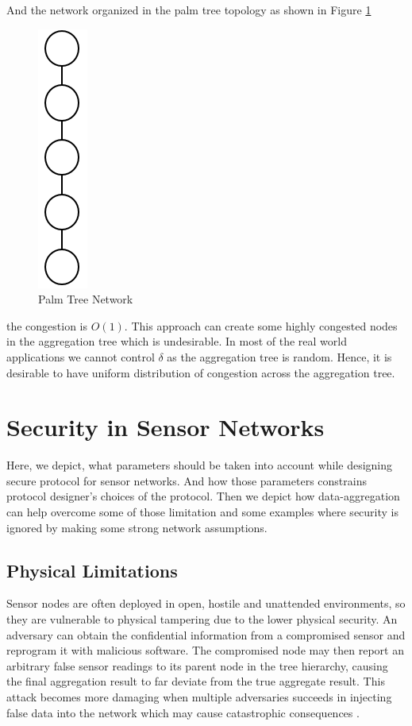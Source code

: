 	And the network organized in the palm tree topology as shown in Figure \ref{fig:palm-tree-network}
	\begin{figure}[h!]
		\centering
		\includegraphics[scale = 1]{images/palm-tree.png}
		\caption{Palm Tree Network}
		\label{fig:palm-tree-network}
	\end{figure}
	the congestion is $O(1)$.
	This approach can create some highly congested nodes in the aggregation tree which is undesirable.
	In most of the real world applications we cannot control $\delta$ as the aggregation tree is random.
	Hence, it is desirable to have uniform distribution of congestion across the aggregation tree.



\section{Security in Sensor Networks}
	\label{sec:aggregate-adversary}
	Here, we depict, what parameters should be taken into account while designing secure protocol for sensor networks.  
	And how those parameters constrains protocol designer's choices of the protocol.
	Then we depict how data-aggregation can help overcome some of those limitation and some examples where security is ignored by making some strong network assumptions.

	\subsection{Physical Limitations}
	Sensor nodes are often deployed in open, hostile and unattended environments, so they are vulnerable to physical tampering due to the lower physical security.
	An adversary can obtain the confidential information from a compromised sensor and reprogram it with malicious software.
	The compromised node may then report an arbitrary false sensor readings to its parent node in the tree hierarchy, causing the final aggregation result to far deviate from the true aggregate result.
	This attack becomes more damaging when multiple adversaries succeeds in injecting false data into the network which may cause catastrophic consequences \cite{wagner2007algorithms}.	

